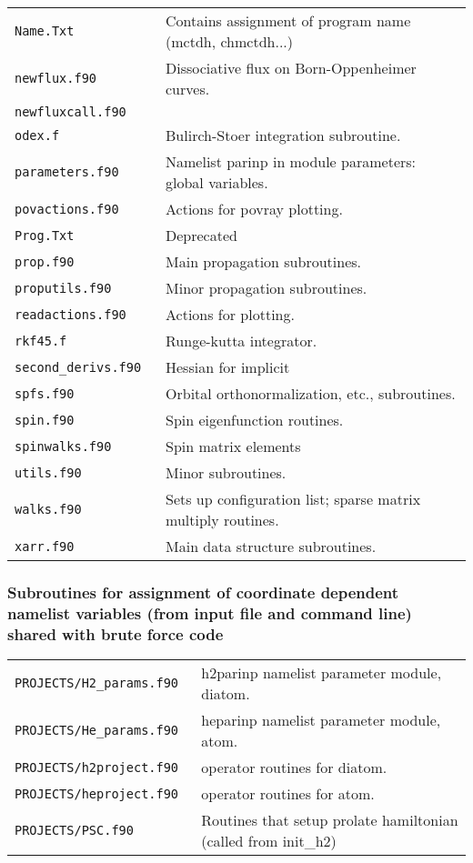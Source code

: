 {\begin{tabular}{ll}
\verb#Name.Txt       #& Contains assignment of program name (mctdh, chmctdh...) \\
\verb#newflux.f90    #& Dissociative flux on Born-Oppenheimer curves. \\
\verb#newfluxcall.f90    #& \\
\verb#odex.f         #& Bulirch-Stoer integration subroutine. \\
\verb#parameters.f90 #& Namelist parinp in module parameters: global variables. \\
\verb#povactions.f90 #& Actions for povray plotting. \\
\verb#Prog.Txt       #& Deprecated \\
\verb#prop.f90       #& Main propagation subroutines. \\
\verb#proputils.f90  #& Minor propagation subroutines. \\
\verb#readactions.f90#& Actions for plotting. \\
\verb#rkf45.f        #& Runge-kutta integrator. \\
\verb#second_derivs.f90# &Hessian for implicit \\
\verb#spfs.f90       #& Orbital orthonormalization, etc., subroutines. \\
\verb#spin.f90       #& Spin eigenfunction routines. \\
\verb#spinwalks.f90  #& Spin matrix elements \\
\verb#utils.f90      #& Minor subroutines. \\
\verb#walks.f90      #& Sets up configuration list; sparse matrix multiply routines. \\
\verb#xarr.f90       #& Main data structure subroutines. \\
\end{tabular}
}


\subsubsection{Subroutines for assignment of coordinate dependent namelist variables (from input file and command line) shared with brute force code}
{\footnotesize
\begin{tabular}{ll}
\verb#PROJECTS/H2_params.f90  #& h2parinp namelist parameter module, diatom. \\
\verb#PROJECTS/He_params.f90  #& heparinp namelist parameter module, atom. \\
\verb#PROJECTS/h2project.f90  #& operator routines for diatom. \\
\verb#PROJECTS/heproject.f90  #& operator routines for atom. \\
\verb#PROJECTS/PSC.f90        #& Routines that setup prolate hamiltonian (called from init\_h2) \\
\end{tabular}
}



